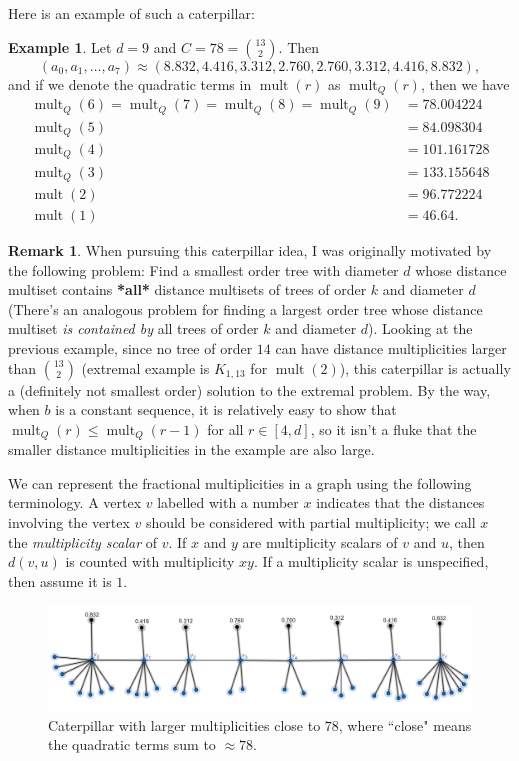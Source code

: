 \documentclass[12]{article}
\DeclareMathOperator{\mult}{mult}
\theoremstyle{definition}
\newtheorem{eg}{Example}
\newtheorem{rem}[thm]{Remark}
\begin{document}
		Here is an example of such a caterpillar:
		
		\begin{eg}
			Let $d = 9$ and $C = 78 = {13 \choose 2}$.  Then 
			$$(a_0, a_1, \ldots, a_{7}) \approx (8.832, 4.416, 3.312, 2.760, 2.760, 3.312, 4.416, 8.832),$$
			and if we denote the quadratic terms in $\mult(r)$ as $\mult_{Q}(r)$, then we have 
			\begin{align*}
				\mult_{Q}(6) = \mult_{Q}(7) = \mult_{Q}(8) = \mult_{Q}(9) &= 78.004224	\\
				\mult_{Q}(5) &= 84.098304	\\
				\mult_{Q}(4) &= 101.161728	\\
				\mult_{Q}(3) &= 133.155648	\\
				\mult(2) &= 96.772224	\\
				\mult(1) &= 46.64.
			\end{align*}
		
		\begin{rem}
			When pursuing this caterpillar idea, I was originally motivated by the following problem: Find a smallest order tree with diameter $d$ whose distance multiset contains \textbf{*all*} distance multisets of trees of order $k$ and diameter $d$ (There's an analogous problem for finding a largest order tree whose distance multiset \emph{is contained by} all trees of order $k$ and diameter $d$).  Looking at the previous example, since no tree of order $14$ can have distance multiplicities larger than ${13 \choose 2}$ (extremal example is $K_{1,13}$ for $\mult(2)$), this caterpillar is actually a (definitely not smallest order) solution to the extremal problem.  By the way, when $b$ is a constant sequence, it is relatively easy to show that $\mult_Q(r) \leq \mult_Q(r-1)$ for all $r \in [4, d]$, so it isn't a fluke that the smaller distance multiplicities in the example are also large.
		\end{rem}
		
		We can represent the fractional multiplicities in a graph using the following terminology.  A vertex $v$ labelled with a number $x$ indicates that the distances involving the vertex $v$ should be considered with partial multiplicity; we call $x$ the \emph{multiplicity scalar} of $v$.  If $x$ and $y$ are multiplicity scalars of $v$ and $u$, then $d(v,u)$ is counted with multiplicity $xy$.  If a multiplicity scalar is unspecified, then assume it is $1$.
		\begin{figure}[ht]
			\begin{center}
				\includegraphics[scale = 0.5]{CaterpillarExample1(ConstantMults).png}
			\end{center}
		\caption{Caterpillar with larger multiplicities close to $78$, where ``close" means the quadratic terms sum to $\approx 78$.  }
		\end{figure}
		

\end{eg}
\end{document}
